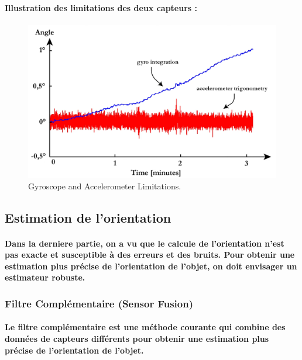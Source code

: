 \paragraph{Illustration des limitations des deux capteurs :}
\paragraph*{}
\begin{figure}[!htpb]
	\centering
	\includegraphics[width=0.7\linewidth]{Figures/accel-gyro-limitations.png}
	\caption{Gyroscope and Accelerometer Limitations.}
\end{figure}


\subsection{Estimation de l'orientation}

\paragraph{Dans la derniere partie, on a vu que le calcule de l'orientation n'est pas exacte et susceptible à des erreurs et des bruits. Pour obtenir une estimation plus précise de l'orientation de l'objet, on doit envisager un estimateur robuste.}

\subsubsection{Filtre Complémentaire (Sensor Fusion)}

\paragraph{Le filtre complémentaire est une méthode courante qui combine des données de capteurs différents pour obtenir une estimation plus précise de l'orientation de l'objet.}
